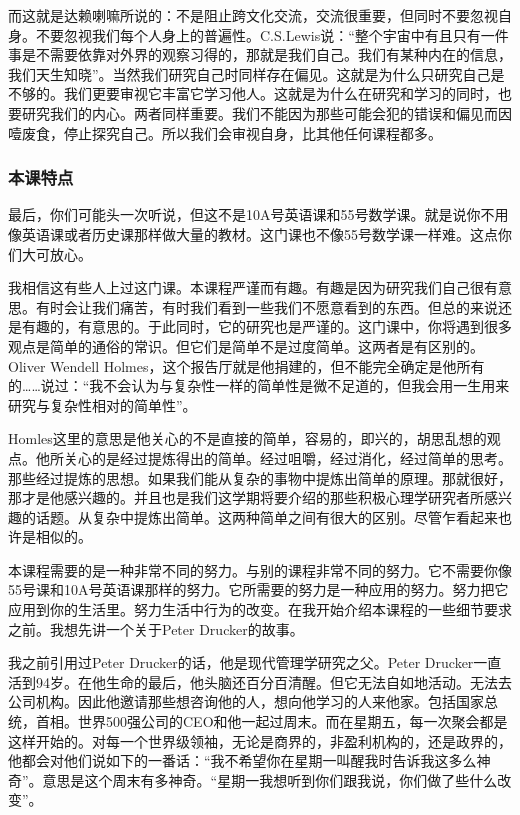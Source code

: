 而这就是达赖喇嘛所说的：不是阻止跨文化交流，交流很重要，但同时不要忽视自身。不要忽视我们每个人身上的普遍性。C.S.Lewis说：“整个宇宙中有且只有一件事是不需要依靠对外界的观察习得的，那就是我们自己。我们有某种内在的信息，我们天生知晓”。当然我们研究自己时同样存在偏见。这就是为什么只研究自己是不够的。我们更要审视它丰富它学习他人。这就是为什么在研究和学习的同时，也要研究我们的内心。两者同样重要。我们不能因为那些可能会犯的错误和偏见而因噎废食，停止探究自己。所以我们会审视自身，比其他任何课程都多。 

\subsubsection{本课特点}
最后，你们可能头一次听说，但这不是10A号英语课和55号数学课。就是说你不用像英语课或者历史课那样做大量的教材。这门课也不像55号数学课一样难。这点你们大可放心。

我相信这有些人上过这门课。本课程严谨而有趣。有趣是因为研究我们自己很有意思。有时会让我们痛苦，有时我们看到一些我们不愿意看到的东西。但总的来说还是有趣的，有意思的。于此同时，它的研究也是严谨的。这门课中，你将遇到很多观点是简单的通俗的常识。但它们是简单不是过度简单。这两者是有区别的。Oliver Wendell Holmes，这个报告厅就是他捐建的，但不能完全确定是他所有的……说过：“我不会认为与复杂性一样的简单性是微不足道的，但我会用一生用来研究与复杂性相对的简单性”。

Homles这里的意思是他关心的不是直接的简单，容易的，即兴的，胡思乱想的观点。他所关心的是经过提炼得出的简单。经过咀嚼，经过消化，经过简单的思考。那些经过提炼的思想。如果我们能从复杂的事物中提炼出简单的原理。那就很好，那才是他感兴趣的。并且也是我们这学期将要介绍的那些积极心理学研究者所感兴趣的话题。从复杂中提炼出简单。这两种简单之间有很大的区别。尽管乍看起来也许是相似的。

本课程需要的是一种非常不同的努力。与别的课程非常不同的努力。它不需要你像55号课和10A号英语课那样的努力。它所需要的努力是一种应用的努力。努力把它应用到你的生活里。努力生活中行为的改变。在我开始介绍本课程的一些细节要求之前。我想先讲一个关于Peter Drucker的故事。

我之前引用过Peter Drucker的话，他是现代管理学研究之父。Peter Drucker一直活到94岁。在他生命的最后，他头脑还百分百清醒。但它无法自如地活动。无法去公司机构。因此他邀请那些想咨询他的人，想向他学习的人来他家。包括国家总统，首相。世界500强公司的CEO和他一起过周末。而在星期五，每一次聚会都是这样开始的。对每一个世界级领袖，无论是商界的，非盈利机构的，还是政界的，他都会对他们说如下的一番话：“我不希望你在星期一叫醒我时告诉我这多么神奇”。意思是这个周末有多神奇。“星期一我想听到你们跟我说，你们做了些什么改变”。

